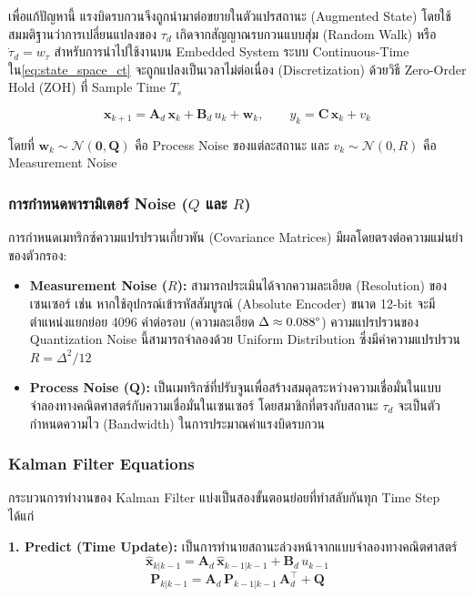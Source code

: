 เพื่อแก้ปัญหานี้ แรงบิดรบกวนจึงถูกนำมาต่อขยายในตัวแปรสถานะ (Augmented State) โดยใช้สมมติฐานว่าการเปลี่ยนแปลงของ $\tau_d$ เกิดจากสัญญาณรบกวนแบบสุ่ม (Random Walk) หรือ $\dot{\tau}_d = w_\tau$ 
สำหรับการนำไปใช้งานบน Embedded System ระบบ Continuous-Time ใน\cref{eq:state_space_ct} จะถูกแปลงเป็นเวลาไม่ต่อเนื่อง (Discretization) ด้วยวิธี Zero-Order Hold (ZOH) ที่ Sample Time $T_s$

\begin{equation}
    \mathbf{x}_{k+1} = \mathbf{A}_d\,\mathbf{x}_k + \mathbf{B}_d\,u_k + \mathbf{w}_k, \qquad
    y_k = \mathbf{C}\,\mathbf{x}_k + v_k
    \label{eq:state_space_dt}
\end{equation}

\noindent โดยที่ $\mathbf{w}_k \sim \mathcal{N}(\mathbf{0}, \mathbf{Q})$ คือ Process Noise ของแต่ละสถานะ และ $v_k \sim \mathcal{N}(0, R)$ คือ Measurement Noise

\subsubsection{การกำหนดพารามิเตอร์ Noise ($Q$ และ $R$)}

การกำหนดเมทริกซ์ความแปรปรวนเกี่ยวพัน (Covariance Matrices) มีผลโดยตรงต่อความแม่นยำของตัวกรอง:
\begin{itemize}
    \item \textbf{Measurement Noise ($R$):} สามารถประเมินได้จากความละเอียด (Resolution) ของเซนเซอร์ เช่น หากใช้อุปกรณ์เข้ารหัสสัมบูรณ์ (Absolute Encoder) ขนาด 12-bit จะมีตำแหน่งแยกย่อย 4096 ค่าต่อรอบ (ความละเอียด $\Delta \approx 0.088\degree$) ความแปรปรวนของ Quantization Noise นี้สามารถจำลองด้วย Uniform Distribution ซึ่งมีค่าความแปรปรวน $R = \Delta^2 / 12$
    \item \textbf{Process Noise ($\mathbf{Q}$):} เป็นเมทริกซ์ที่ปรับจูนเพื่อสร้างสมดุลระหว่างความเชื่อมั่นในแบบจำลองทางคณิตศาสตร์กับความเชื่อมั่นในเซนเซอร์ โดยสมาชิกที่ตรงกับสถานะ $\tau_d$ จะเป็นตัวกำหนดความไว (Bandwidth) ในการประมาณค่าแรงบิดรบกวน
\end{itemize}

\subsubsection{Kalman Filter Equations}

กระบวนการทำงานของ Kalman Filter แบ่งเป็นสองขั้นตอนย่อยที่ทำสลับกันทุก Time Step ได้แก่

\noindent\textbf{1. Predict (Time Update):} เป็นการทำนายสถานะล่วงหน้าจากแบบจำลองทางคณิตศาสตร์
\begin{equation}
    \hat{\mathbf{x}}_{k|k-1} = \mathbf{A}_d\,\hat{\mathbf{x}}_{k-1|k-1} + \mathbf{B}_d\,u_{k-1}
    \label{eq:kf_predict_x}
\end{equation}
\begin{equation}
    \mathbf{P}_{k|k-1} = \mathbf{A}_d\,\mathbf{P}_{k-1|k-1}\,\mathbf{A}_d^\top + \mathbf{Q}
    \label{eq:kf_predict_P}
\end{equation}

